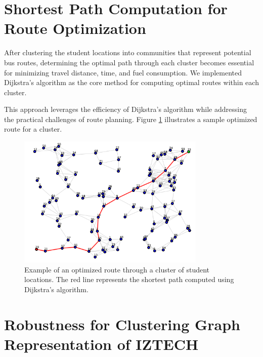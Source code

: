 \section{Shortest Path Computation for Route Optimization}
\label{sec:shortest_path}

After clustering the student locations into communities that represent potential bus routes, determining the optimal path through each cluster becomes essential for minimizing travel distance, time, and fuel consumption. We implemented Dijkstra's algorithm as the core method for computing optimal routes within each cluster.

This approach leverages the efficiency of Dijkstra's algorithm while addressing the practical challenges of route planning. Figure \ref{fig:route_optimization} illustrates a sample optimized route for a cluster.

\begin{figure}[!htbp]
\centering
\includegraphics[width=0.8\textwidth]{img/shortest_path}
\caption{Example of an optimized route through a cluster of student locations. The red line represents the shortest path computed using Dijkstra's algorithm.}
\label{fig:route_optimization}
\end{figure}

\section{Robustness for Clustering Graph Representation of IZTECH}
\label{sec:robustness}





